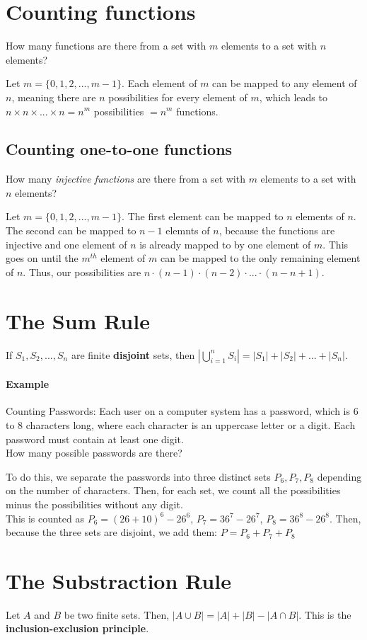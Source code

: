 \documentclass[10pt,a4paper]{book}
\begin{document}
\section{Counting functions}
How many functions are there from a set with $m$ elements to a set with $n$ elements?\par 
Let $m = \{0,1,2,...,m-1\}$. Each element of $m$ can be mapped to any element of $n$, meaning there are $n$ possibilities for every element of $m$, which leads to $n\times n\times ...\times n = n^m$ possibilities $=n^m$ functions.
\subsection{Counting one-to-one functions}
How many \textit{injective functions } are there from a set with $m$ elements to a set with $n$ elements?\par 
Let $m= \{0,1,2,...,m-1\}$. The first element can be mapped to $n$ elements of $n$. The second can be mapped to $n-1$ elemnts of $n$, because the functions are injective and one element of $n$ is already mapped to by one element of $m$. This goes on until the $m^{th}$ element of $m$ can be mapped to the only remaining element of $n$. Thus, our possibilities are $n\cdot (n-1)\cdot (n-2)\cdot ...\cdot (n-n+1)$.
\section{The Sum Rule}
If $S_1,S_2,...,S_n$ are finite \textbf{disjoint} sets, then $|\bigcup_{i=1}^{n} S_i| = |S_1| + |S_2| + ... + |S_n|$.
\paragraph*{Example}
Counting Passwords: Each user on a computer system has a password, which is 6 to 8 characters long, where each character is an uppercase letter or a digit. Each password must contain at least one digit. \\
How many possible passwords are there?\par 
To do this, we separate the passwords into three distinct sets $P_6,P_7,P_8$ depending on the number of characters. Then, for each set, we count all the possibilities minus the possibilities without any digit.\\
This is counted as $P_6=(26+10)^6-26^6$, $P_7=36^7-26^7$, $P_8=36^8-26^8$. Then, because the three sets are disjoint, we add them: $P=P_6+P_7+P_8$
\section{The Substraction Rule}
Let $A$ and $B$ be two finite sets. Then, $|A\cup B|=|A|+|B|-|A\cap B|$. This is the \textbf{inclusion-exclusion principle}.
\end{document}
